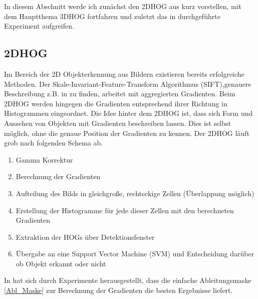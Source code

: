 In diesem Abschnitt werde ich zunächst den 2DHOG aus \cite{dalal2005histograms} kurz vorstellen, mit dem Hauptthema 3DHOG fortfahren und zuletzt das in \cite{scherer2010histograms} durchgeführte Experiment aufgreifen.

\subsection{2DHOG}
Im Bereich der 2D Objekterkennung aus Bildern existieren bereits erfolgreiche Methoden. Der Skale-Invariant-Feature-Transform Algorithmus (SIFT),genauere Beschreibung z.B. in \cite{Priese15}
zu finden, arbeitet mit aggregierten Gradienten. Beim 2DHOG werden hingegen die Gradienten entsprechend
ihrer Richtung in Histogrammen eingeordnet.
\newline
Die Idee hinter dem 2DHOG ist, dass sich Form und Aussehen von Objekten mit Gradienten beschreiben lassen.
Dies ist selbst möglich, ohne die genaue Position der Gradienten zu kennen. Der 2DHOG läuft grob nach folgenden Schema ab. 
\begin{enumerate} 
	\item Gamma Korrektur
	\item Berechnung der Gradienten
	\item Aufteilung des Bilds in gleichgroße, rechteckige Zellen (Überlappung möglich)
	\item Erstellung der Histogramme für jede dieser Zellen mit den berechneten Gradienten
	\item Extraktion der HOGs über Detektionsfenster
	\item Übergabe an eine Support Vector Machine (SVM) und Entscheidung darüber ob Objekt erkannt oder nicht
	
\end{enumerate}



In \cite{dalal2005histograms} hat sich durch Experimente herausgestellt, dass die einfache Ableitungsmaske \ref{Abl_Maske} zur Berechnung der Gradienten die besten Ergebnisse liefert. 

